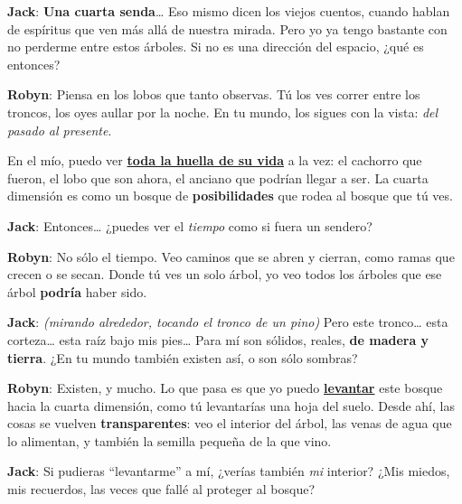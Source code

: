 \documentclass{article}
\begin{document}
\medskip

\noindent\textcolor{Cerulean}{\textbf{Jack}}:\quad
\textbf{Una cuarta senda}…  
Eso mismo dicen los viejos cuentos, cuando hablan de espíritus que ven más allá de nuestra mirada.  
Pero yo ya tengo bastante con no perderme entre estos árboles.  
Si no es una dirección del espacio, ¿qué es entonces?

\medskip

\noindent\textcolor{Cinnabar}{\textbf{Robyn}}:\quad
Piensa en los lobos que tanto observas.  
Tú los ves correr entre los troncos, los oyes aullar por la noche.  
En tu mundo, los sigues con la vista: \emph{del pasado al presente}.  

En el mío, puedo ver \underline{\textbf{toda la huella de su vida}} a la vez:  
el cachorro que fueron, el lobo que son ahora, el anciano que podrían llegar a ser.  
La cuarta dimensión es como un bosque de \textcolor{Horizon}{\textbf{posibilidades}} que rodea al bosque que tú ves.

\medskip

\noindent\textcolor{Cerulean}{\textbf{Jack}}:\quad
Entonces… ¿puedes ver el \emph{tiempo} como si fuera un sendero?

\medskip

\noindent\textcolor{Cinnabar}{\textbf{Robyn}}:\quad
No sólo el tiempo.  
Veo caminos que se abren y cierran, como ramas que crecen o se secan.  
Donde tú ves un solo árbol, yo veo todos los árboles que ese árbol \textbf{podría} haber sido.

\medskip

\noindent\textcolor{Cerulean}{\textbf{Jack}}:\quad
\emph{(mirando alrededor, tocando el tronco de un pino)}  
Pero este tronco… esta corteza… esta raíz bajo mis pies…  
Para mí son sólidos, reales, \textcolor{Metallic Bronze}{\textbf{de madera y tierra}}.  
¿En tu mundo también existen así, o son sólo sombras?

\medskip

\noindent\textcolor{Cinnabar}{\textbf{Robyn}}:\quad
Existen, y mucho.  
Lo que pasa es que yo puedo \underline{\textbf{levantar}} este bosque hacia la cuarta dimensión,  
como tú levantarías una hoja del suelo.  
Desde ahí, las cosas se vuelven \textbf{transparentes}:  
veo el interior del árbol, las venas de agua que lo alimentan,  
y también la semilla pequeña de la que vino.

\medskip

\noindent\textcolor{Cerulean}{\textbf{Jack}}:\quad
Si pudieras “levantarme” a mí, ¿verías también \emph{mi} interior?  
¿Mis miedos, mis recuerdos, las veces que fallé al proteger al bosque?
\end{document}
